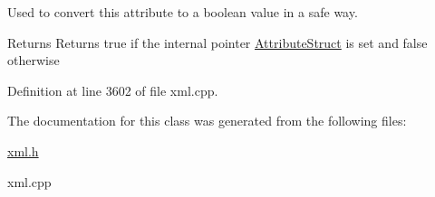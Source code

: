 Used to convert this attribute to a boolean value in a safe way. 

\begin{DoxyReturn}{Returns}
Returns true if the internal pointer \hyperlink{structphys_1_1xml_1_1AttributeStruct}{AttributeStruct} is set and false otherwise 
\end{DoxyReturn}


Definition at line 3602 of file xml.cpp.



The documentation for this class was generated from the following files:\begin{DoxyCompactItemize}
\item 
\hyperlink{xml_8h}{xml.h}\item 
xml.cpp\end{DoxyCompactItemize}
